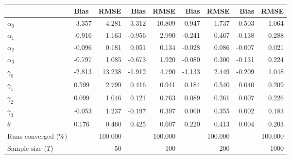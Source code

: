 
\begin{tabular}[t]{llrrrrrrr}
\toprule
  & Bias & RMSE & Bias & RMSE & Bias & RMSE & Bias & RMSE\\
\midrule
$\alpha_{0}$ & -3.357 & 4.281 & -3.312 & 10.809 & -0.947 & 1.737 & -0.503 & 1.064\\
$\alpha_{1}$ & -0.916 & 1.163 & -0.956 & 2.990 & -0.241 & 0.467 & -0.138 & 0.288\\
$\alpha_{2}$ & -0.096 & 0.181 & 0.051 & 0.134 & -0.028 & 0.086 & -0.007 & 0.021\\
$\alpha_{3}$ & -0.797 & 1.085 & -0.673 & 1.920 & -0.080 & 0.300 & -0.131 & 0.224\\
$\gamma_{0}$ & -2.813 & 13.238 & -1.912 & 4.790 & -1.133 & 2.449 & -0.209 & 1.048\\
$\gamma_{1}$ & 0.599 & 2.799 & 0.416 & 0.941 & 0.184 & 0.540 & 0.040 & 0.209\\
$\gamma_{2}$ & 0.099 & 1.046 & 0.121 & 0.763 & 0.089 & 0.261 & 0.007 & 0.226\\
$\gamma_{3}$ & -0.053 & 1.237 & -0.197 & 0.397 & 0.000 & 0.355 & 0.002 & 0.183\\
$\theta$ & 0.176 & 0.460 & 0.425 & 0.607 & 0.220 & 0.413 & 0.004 & 0.203\\
Runs converged (\%) &  & 100.000 &  & 100.000 &  & 100.000 &  & 100.000\\
Sample size ($T$) &  & 50 &  & 100 &  & 200 &  & 1000\\
\bottomrule
\end{tabular}
